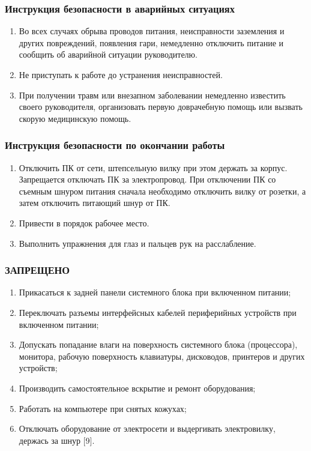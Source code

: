 \subsubsection{Инструкция безопасности в аварийных ситуациях}

\begin{enumerate}
 \item Во всех случаях обрыва проводов питания, неисправности заземления и других повреждений, появления гари, немедленно отключить питание и сообщить об аварийной ситуации руководителю.
 \item Не приступать к работе до устранения неисправностей.
 \item При получении травм или внезапном заболевании немедленно известить своего руководителя, организовать первую доврачебную помощь или вызвать скорую медицинскую помощь.
\end{enumerate}

\subsubsection{Инструкция безопасности по окончании работы}

\begin{enumerate}
 \item Отключить ПК от сети, штепсельную вилку при этом держать за корпус. Запрещается отключать ПК за электропровод. При отключении ПК со съемным шнуром питания сначала необходимо отключить вилку от розетки, а затем отключить питающий шнур от ПК.
 \item Привести в порядок рабочее место.
 \item Выполнить упражнения для глаз и пальцев рук на расслабление.
\end{enumerate}

\subsubsection{ЗАПРЕЩЕНО}

\begin{enumerate}
 \item Прикасаться к задней панели системного блока при включенном питании;
 \item Переключать разъемы интерфейсных кабелей периферийных устройств при включенном питании;
 \item Допускать попадание влаги на поверхность системного блока (процессора), монитора, рабочую поверхность клавиатуры, дисководов, принтеров и других устройств;
 \item Производить самостоятельное вскрытие и ремонт оборудования;
 \item Работать на компьютере при снятых кожухах;
 \item Отключать оборудование от электросети и выдергивать электровилку, держась за шнур [9].
\end{enumerate}

